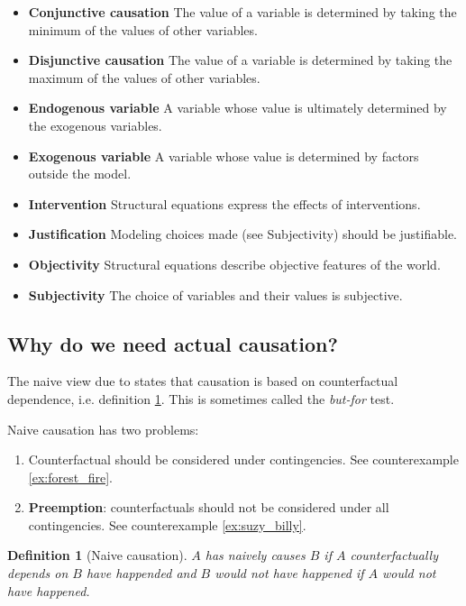 \documentclass{iosart2c}
\newtheorem{definition}{Definition}
\begin{document}
\begin{itemize}
\item \textbf{Conjunctive causation} The value of a variable is determined by taking the minimum of the values of other variables.
\item \textbf{Disjunctive causation} The value of a variable is determined by taking the maximum of the values of other variables.
\item \textbf{Endogenous variable} A variable whose value is ultimately determined by the exogenous variables.
\item \textbf{Exogenous variable} A variable whose value is determined by factors outside the model.
\item \textbf{Intervention} Structural equations express the effects of interventions.
\item \textbf{Justification} Modeling choices made (see Subjectivity) should be justifiable.
\item \textbf{Objectivity} Structural equations describe objective features of the world.
\item \textbf{Subjectivity} The choice of variables and their values is subjective.
\end{itemize}

\subsection{Why do we need actual causation?}

The naive view due to \cite{hume1739} states that causation is based on counterfactual dependence, i.e. definition \ref{def:naive_causation}.
This is sometimes called the \emph{but-for} test.

Naive causation has two problems:
\begin{enumerate}
\item Counterfactual should be considered under contingencies.
      See counterexample \ref{ex:forest_fire}.
\item \textbf{Preemption}: counterfactuals should not be considered under all contingencies.
      See counterexample \ref{ex:suzy_billy}.
\end{enumerate}

\begin{definition}[Naive causation]
\label{def:naive_causation}
$A$ has naively causes $B$ if $A$ counterfactually depends on $B$ have happended and $B$ would not have happened if $A$ would not have happened.
\end{definition}
\end{document}
